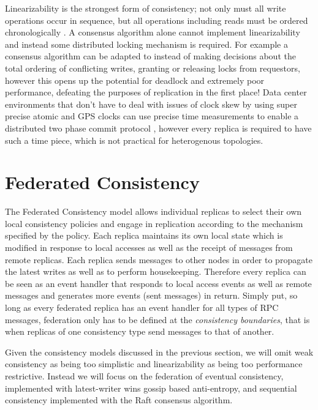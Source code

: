 \documentclass[10pt,conference,letterpaper]{IEEEtran}
\begin{document}
Linearizability is the strongest form of consistency; not only must all write operations occur in sequence, but all operations including reads must be ordered chronologically \cite{herlihy_linearizability:_1990}. A consensus algorithm alone cannot implement linearizability and instead some distributed locking mechanism is required. For example a consensus algorithm can be adapted to instead of making decisions about the total ordering of conflicting writes, granting or releasing locks from requestors, however this opens up the potential for deadlock and extremely poor performance, defeating the purposes of replication in the first place! Data center environments that don't have to deal with issues of clock skew by using super precise atomic and GPS clocks can use precise time measurements to enable a distributed two phase commit protocol \cite{corbett_spanner:_2013}, however every replica is required to have such a time piece, which is not practical for heterogenous topologies.

\section{Federated Consistency}

The Federated Consistency model allows individual replicas to select their own local consistency policies and engage in replication according to the mechanism specified by the policy. Each replica maintains its own local state which is modified in response to local accesses as well as the receipt of messages from remote replicas. Each replica sends messages to other nodes in order to propagate the latest writes as well as to perform housekeeping. Therefore every replica can be seen as an event handler that responds to local access events as well as remote messages and generates more events (sent messages) in return. Simply put, so long as every federated replica has an event handler for all types of RPC messages, federation only has to be defined at the \textit{consistency boundaries}, that is when replicas of one consistency type send messages to that of another.

Given the consistency models discussed in the previous section, we will omit weak consistency as being too simplistic and linearizability as being too performance restrictive. Instead we will focus on the federation of eventual consistency, implemented with latest-writer wins gossip based anti-entropy, and sequential consistency implemented with the Raft consensus algorithm.
\end{document}
